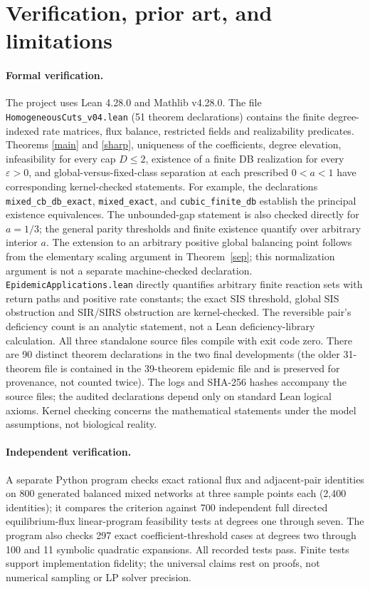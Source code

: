 \documentclass[11pt]{article}
\begin{document}
\section{Verification, prior art, and limitations}
\paragraph{Formal verification.} The project uses Lean 4.28.0 and Mathlib v4.28.0. The file \texttt{HomogeneousCuts\_v04.lean} (51 theorem declarations) contains the finite degree-indexed rate matrices, flux balance, restricted fields and realizability predicates. Theorems \ref{main} and \ref{sharp}, uniqueness of the coefficients, degree elevation, infeasibility for every cap $D\leq2$, existence of a finite DB realization for every $\varepsilon>0$, and global-versus-fixed-class separation at each prescribed $0<a<1$ have corresponding kernel-checked statements. For example, the declarations \texttt{mixed\_cb\_db\_exact}, \texttt{mixed\_exact}, and \texttt{cubic\_finite\_db} establish the principal existence equivalences. The unbounded-gap statement is also checked directly for $a=1/3$; the general parity thresholds and finite existence quantify over arbitrary interior $a$. The extension to an arbitrary positive global balancing point follows from the elementary scaling argument in Theorem~\ref{sep}; this normalization argument is not a separate machine-checked declaration. \texttt{EpidemicApplications.lean} directly quantifies arbitrary finite reaction sets with return paths and positive rate constants; the exact SIS threshold, global SIS obstruction and SIR/SIRS obstruction are kernel-checked. The reversible pair's deficiency count is an analytic statement, not a Lean deficiency-library calculation. All three standalone source files compile with exit code zero. There are 90 distinct theorem declarations in the two final developments (the older 31-theorem file is contained in the 39-theorem epidemic file and is preserved for provenance, not counted twice). The logs and SHA-256 hashes accompany the source files; the audited declarations depend only on standard Lean logical axioms. Kernel checking concerns the mathematical statements under the model assumptions, not biological reality.

\paragraph{Independent verification.} A separate Python program checks exact rational flux and adjacent-pair identities on 800 generated balanced mixed networks at three sample points each (2,400 identities); it compares the criterion against 700 independent full directed equilibrium-flux linear-program feasibility tests at degrees one through seven. The program also checks 297 exact coefficient-threshold cases at degrees two through 100 and 11 symbolic quadratic expansions. All recorded tests pass. Finite tests support implementation fidelity; the universal claims rest on proofs, not numerical sampling or LP solver precision.
\end{document}
